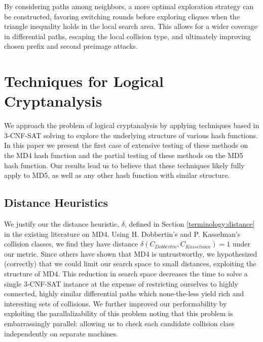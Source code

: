 \documentclass[conference]{IEEEtran}
\begin{document}
By considering paths among neighbors, a more optimal exploration strategy can
be constructed, favoring switching rounds before exploring cliques when the
triangle inequality holds in the local search area. This allows for a wider
coverage in differential paths, escaping the local collision type, and
ultimately improving chosen prefix and second preimage attacks.


\section{Techniques for Logical Cryptanalysis} \label{Sec:Logical}


We approach the problem of logical cryptanalysis by applying
techniques based in 3-CNF-SAT solving to explore the underlying
structure of various hash functions.  In this paper we present the
first case of extensive testing of these methods on the MD4 hash
function and the partial testing of these methods on the MD5 hash
function.  Our results lead us to believe that these techniques likely
fully apply to MD5, as well as any other hash function with similar structure.


\subsection{Distance Heuristics}

We justify our the distance heuristic, $\delta$, defined in Section
\ref{terminology:distance} in the existing literature on MD4.  Using
H. Dobbertin's \cite{Dobbertin1998} and P. Kasselman's \cite{KasselmanMD4}
collision classes, we find they have distance $\delta(C_{Dobbertin}, C_{Kasselman}) = 1$
under our metric. Since others have shown that MD4 is untrustworthy,
we hypothesized (correctly) that we could
limit our search space to small distances, exploiting the structure of MD4. This
reduction in search space decreases the time to solve a single 3-CNF-SAT
instance at the expense of restricting ourselves to highly connected, highly
similar differential paths which none-the-less yield rich and
interesting sets of collisions. We further improved our performability
by exploiting the parallalizability of this problem
noting that this problem is embarrassingly parallel: allowing us to
check each
candidate collision class independently on separate machines.
\end{document}
